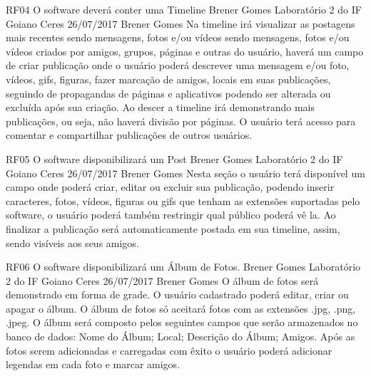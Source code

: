  \requisitoFuncional
 {RF04}
 {O software deverá conter uma Timeline}
 {Brener Gomes}
 {Laboratório 2 do IF Goiano Ceres}
 {26/07/2017}
 {Brener Gomes}
 {Na timeline irá visualizar as postagens mais recentes sendo mensagens, fotos e/ou vídeos sendo mensagens, fotos e/ou vídeos criados por amigos, grupos, páginas e outras do usuário, haverá um campo de criar publicação onde o usuário poderá descrever uma mensagem e/ou foto, vídeos, gifs, figuras, fazer marcação de amigos, locais em suas publicações, seguindo de propagandas de páginas e aplicativos podendo ser alterada ou excluída após sua criação. Ao descer a timeline irá demonstrando mais publicações, ou seja, não haverá divisão por páginas. O usuário terá acesso para comentar e compartilhar publicações de outros usuários.
 }
 
 \requisitoFuncional
 {RF05}
 {O software disponibilizará um Post}
 {Brener Gomes}
 {Laboratório 2 do IF Goiano Ceres}
 {26/07/2017}
 {Brener Gomes}
 {Nesta seção o usuário terá disponível um campo onde poderá criar, editar ou excluir sua publicação, podendo inserir caracteres, fotos, vídeos, figuras ou gifs que tenham as extensões suportadas pelo software, o usuário poderá também restringir qual público poderá vê la. Ao finalizar a publicação será automaticamente postada em sua timeline, assim, sendo visíveis aos seus amigos.
 }
 
 \requisitoFuncional
 {RF06}
 {O software disponibilizará um Álbum de Fotos.}
 {Brener Gomes}
 {Laboratório 2 do IF Goiano Ceres}
 {26/07/2017}
 {Brener Gomes}
 {O álbum de fotos será demonstrado em forma de grade. O usuário cadastrado poderá editar, criar ou apagar o álbum. O álbum de fotos só aceitará fotos com as extensões .jpg, .png, .jpeg. O álbum será composto pelos seguintes campos que serão armazenados no banco de dados:
  Nome do Álbum;
  Local;
  Descrição do Álbum;
  Amigos.
 Após as fotos serem adicionadas e carregadas com êxito o usuário poderá adicionar legendas em cada foto e marcar amigos.
 }
 

